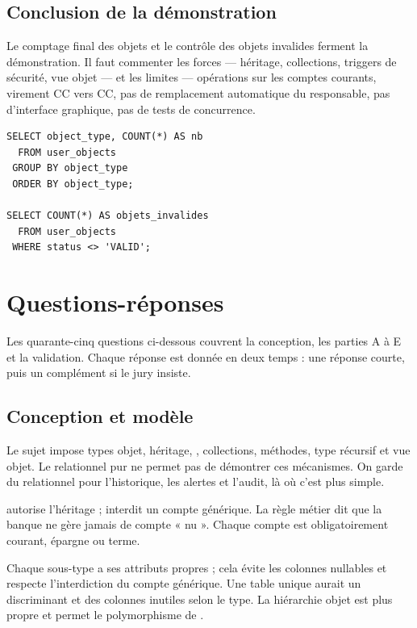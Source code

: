 \subsection{Conclusion de la démonstration}

Le comptage final des objets et le contrôle des objets invalides ferment la
démonstration. Il faut commenter les forces — héritage, collections, triggers
de sécurité, vue objet — et les limites — opérations sur les comptes courants,
virement CC vers CC, pas de remplacement automatique du responsable, pas
d'interface graphique, pas de tests de concurrence.

\begin{lstlisting}[caption={Contrôle final des objets.},label={lst:demo-fin}]
SELECT object_type, COUNT(*) AS nb
  FROM user_objects
 GROUP BY object_type
 ORDER BY object_type;

SELECT COUNT(*) AS objets_invalides
  FROM user_objects
 WHERE status <> 'VALID';
\end{lstlisting}

\section{Questions-réponses}

Les quarante-cinq questions ci-dessous couvrent la conception, les parties A à
E et la validation. Chaque réponse est donnée en deux temps : une réponse
courte, puis un complément si le jury insiste.

\subsection{Conception et modèle}

{Le sujet impose types objet, héritage, , collections, méthodes,
type récursif et vue objet.}
{Le relationnel pur ne permet pas de démontrer ces mécanismes. On garde du
relationnel pour l'historique, les alertes et l'audit, là où c'est plus simple.}

{ autorise l'héritage ;  interdit un
compte générique.}
{La règle métier dit que la banque ne gère jamais de compte « nu ». Chaque
compte est obligatoirement courant, épargne ou terme.}

{Chaque sous-type a ses attributs propres ; cela évite les colonnes nullables
et respecte l'interdiction du compte générique.}
{Une table unique aurait un discriminant et des colonnes inutiles selon le
type. La hiérarchie objet est plus propre et permet le polymorphisme de
.}

